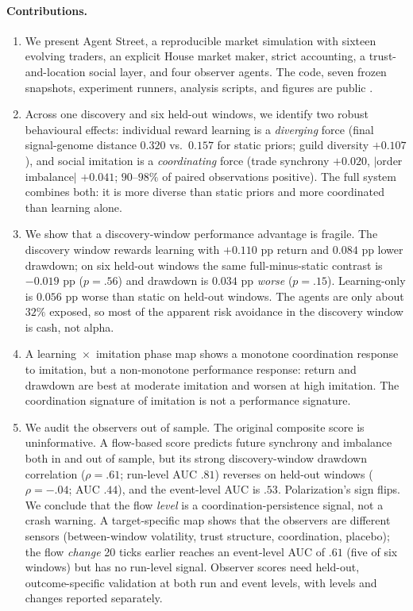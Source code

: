\documentclass[11pt]{article}
\begin{document}
\paragraph{Contributions.}
\begin{enumerate}
  \item We present Agent Street, a reproducible market simulation with sixteen
  evolving traders, an explicit House market maker, strict accounting, a
  trust-and-location social layer, and four observer agents. The code, seven
  frozen snapshots, experiment runners, analysis scripts, and figures are public
  \citep{agentstreet2026}.
  \item Across one discovery and six held-out windows, we identify two robust
  behavioural effects: individual reward learning is a \emph{diverging} force
  (final signal-genome distance $0.320$ vs.\ $0.157$ for static priors; guild
  diversity $+0.107$), and social imitation is a \emph{coordinating} force
  (trade synchrony $+0.020$, $|$order imbalance$|$ $+0.041$; $90$--$98\%$ of
  paired observations positive). The full system combines both: it is more
  diverse than static priors and more coordinated than learning alone.
  \item We show that a discovery-window performance advantage is fragile. The
  discovery window rewards learning with $+0.110$ pp return and $0.084$ pp lower
  drawdown; on six held-out windows the same full-minus-static contrast is
  $-0.019$ pp ($p=.56$) and drawdown is $0.034$ pp \emph{worse} ($p=.15$).
  Learning-only is $0.056$ pp worse than static on held-out windows. The agents
  are only about $32\%$ exposed, so most of the apparent risk avoidance in the
  discovery window is cash, not alpha.
  \item A learning~$\times$~imitation phase map shows a monotone coordination
  response to imitation, but a non-monotone performance response: return and
  drawdown are best at moderate imitation and worsen at high imitation. The
  coordination signature of imitation is not a performance signature.
  \item We audit the observers out of sample. The original composite score is
  uninformative. A flow-based score predicts future synchrony and imbalance both
  in and out of sample, but its strong discovery-window drawdown correlation
  ($\rho=.61$; run-level AUC $.81$) reverses on held-out windows
  ($\rho=-.04$; AUC $.44$), and the event-level AUC is $.53$. Polarization's sign
  flips. We conclude that the flow \emph{level} is a coordination-persistence
  signal, not a crash warning. A target-specific map shows that the observers are
  different sensors (between-window volatility, trust structure, coordination,
  placebo); the flow \emph{change} 20 ticks earlier reaches an event-level AUC of
  $.61$ (five of six windows) but has no run-level signal. Observer scores need
  held-out, outcome-specific validation at both run and event levels, with levels
  and changes reported separately.
\end{enumerate}
\end{document}
